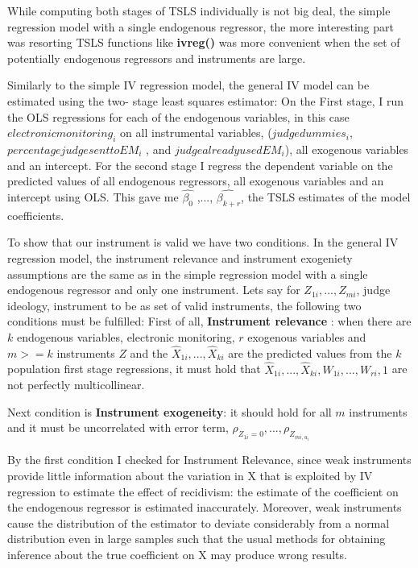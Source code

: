 \documentclass[a4paper,12pt]{article}
\begin{document}
While computing both stages of TSLS individually is not big deal, the simple regression model with a single endogenous regressor, the more interesting part was resorting TSLS functions like \textbf{ivreg()} was more convenient when the set of potentially endogenous regressors and instruments are large. 

Similarly to the simple IV regression model, the general IV model can be estimated using the two- stage least squares estimator: On the First stage, I run the OLS regressions for each of the endogenous variables, in this case $electronic monitoring_i$ on all instrumental variables, ($judge dummies_i$, $percentage judge sent to EM_i$ , and $judge already used EM_i$), all exogenous variables and an intercept. For the second stage I regress the dependent variable on the predicted values of all endogenous regressors, all exogenous variables and an intercept using OLS. This gave me $\widehat{\beta_0}$ ,..., $\widehat{\beta_{k+r}}$, the TSLS estimates of the model coefficients. 

To show that our instrument is valid we have two conditions. In the general IV regression model, the instrument relevance and instrument exogeniety assumptions are the same as in the simple regression model with a single endogenous regressor and only one instrument. Lets say for $Z_{1i},...,Z_{mi}$, judge ideology, instrument to be as set of valid instruments, the following two conditions must be fulfilled: First of all, \textbf{Instrument relevance} : when there are $k$ endogenous variables, electronic monitoring, $r$ exogenous variables and $m >= k$ instruments $Z$ and the $\widehat{X}_{1i} ,..., \widehat{X}_{ki}$ are the predicted values from the  $k$ population first stage regressions, it must hold that $\widehat{X}_{1i} ,..., \widehat{X}_{ki}, W_{1i},...,W_{ri}, 1$ are not perfectly multicollinear. 

Next condition is \textbf{Instrument exogeneity}: it should hold for all $m$ instruments  and it must be uncorrelated with error term, $\rho_{Z_{1i} = 0} ,..., \rho_{Z_{mi,u_i}}$




By the first condition I checked for Instrument Relevance, since weak instruments provide little information about the variation in X that is exploited by IV regression to estimate the effect of recidivism: the estimate of the coefficient on the endogenous regressor is estimated inaccurately. Moreover, weak instruments cause the distribution of the estimator to deviate considerably from a normal distribution even in large samples such that the usual methods for obtaining inference about the true coefficient on  X may produce wrong results. 
\end{document}
